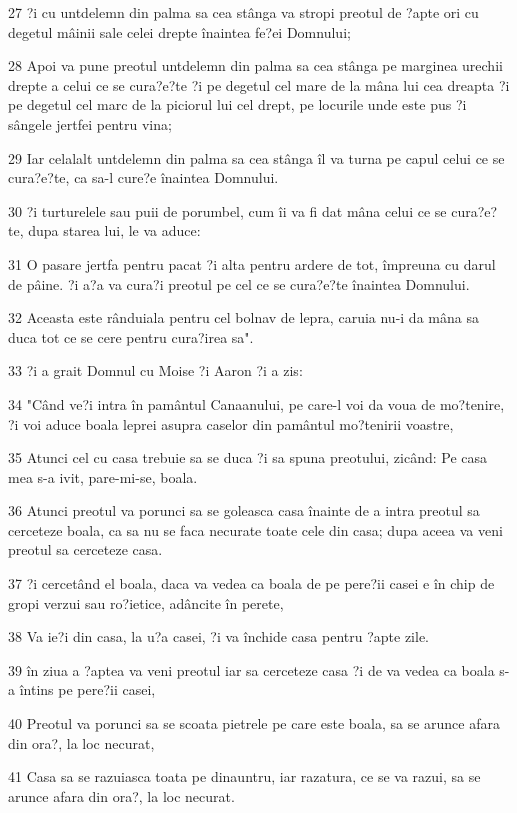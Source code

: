 \par 27 ?i cu untdelemn din palma sa cea stânga va stropi preotul de ?apte ori cu degetul mâinii sale celei drepte înaintea fe?ei Domnului;
\par 28 Apoi va pune preotul untdelemn din palma sa cea stânga pe marginea urechii drepte a celui ce se cura?e?te ?i pe degetul cel mare de la mâna lui cea dreapta ?i pe degetul cel marc de la piciorul lui cel drept, pe locurile unde este pus ?i sângele jertfei pentru vina;
\par 29 Iar celalalt untdelemn din palma sa cea stânga îl va turna pe capul celui ce se cura?e?te, ca sa-l cure?e înaintea Domnului.
\par 30 ?i turturelele sau puii de porumbel, cum îi va fi dat mâna celui ce se cura?e?te, dupa starea lui, le va aduce:
\par 31 O pasare jertfa pentru pacat ?i alta pentru ardere de tot, împreuna cu darul de pâine. ?i a?a va cura?i preotul pe cel ce se cura?e?te înaintea Domnului.
\par 32 Aceasta este rânduiala pentru cel bolnav de lepra, caruia nu-i da mâna sa duca tot ce se cere pentru cura?irea sa".
\par 33 ?i a grait Domnul cu Moise ?i Aaron ?i a zis:
\par 34 "Când ve?i intra în pamântul Canaanului, pe care-l voi da voua de mo?tenire, ?i voi aduce boala leprei asupra caselor din pamântul mo?tenirii voastre,
\par 35 Atunci cel cu casa trebuie sa se duca ?i sa spuna preotului, zicând: Pe casa mea s-a ivit, pare-mi-se, boala.
\par 36 Atunci preotul va porunci sa se goleasca casa înainte de a intra preotul sa cerceteze boala, ca sa nu se faca necurate toate cele din casa; dupa aceea va veni preotul sa cerceteze casa.
\par 37 ?i cercetând el boala, daca va vedea ca boala de pe pere?ii casei e în chip de gropi verzui sau ro?ietice, adâncite în perete,
\par 38 Va ie?i din casa, la u?a casei, ?i va închide casa pentru ?apte zile.
\par 39 în ziua a ?aptea va veni preotul iar sa cerceteze casa ?i de va vedea ca boala s-a întins pe pere?ii casei,
\par 40 Preotul va porunci sa se scoata pietrele pe care este boala, sa se arunce afara din ora?, la loc necurat,
\par 41 Casa sa se razuiasca toata pe dinauntru, iar razatura, ce se va razui, sa se arunce afara din ora?, la loc necurat.
